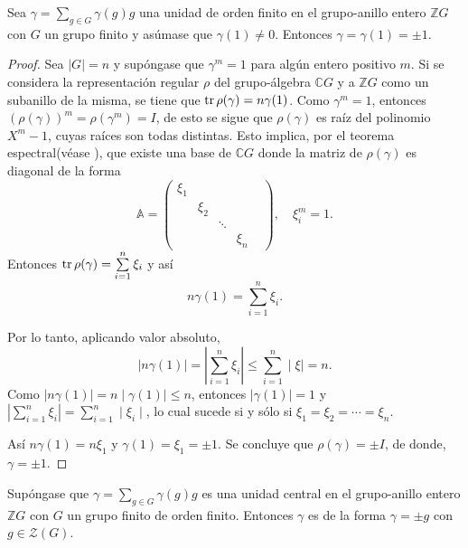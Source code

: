 \begin{lema}\label{lem:BH}
Sea $\gamma = \sum_{g \in G}\gamma(g)g$ una unidad de orden finito en el grupo-anillo entero  $\mathds{Z}G$ con $G$ un grupo finito y asúmase que $\gamma(1)\neq 0$. Entonces $\gamma = \gamma(1) = \pm 1.$
\end{lema}
\begin{proof}
Sea $|G| = n$ y supóngase que $\gamma^{m} = 1$ para algún entero positivo $m$. Si se considera la representación regular $\rho$ del grupo-álgebra $\mathds{C}G$ y a $\mathds{Z}G$ como un subanillo de la misma, se tiene que $\operatorname{tr}\rho(\gamma) = n\gamma(1)$.
Como $\gamma^{m} = 1$, entonces $\left( \rho(\gamma) \right)^m = \rho(\gamma^{m}) = I$, de esto se sigue que $\rho(\gamma)$ es raíz del polinomio $X^m-1$, cuyas raíces son todas distintas. Esto implica, por el teorema espectral(véase \cite[p 214]{bib:lang}), que existe una base de $\mathds{C}G$ donde la matriz de $\rho(\gamma)$ es diagonal de la forma
\begin{equation*}
\mathds{A} = \begin{pmatrix}
\xi_1 & & & &\\
 & \xi_2 & & \\
 & & \ddots & \\
  & & & \xi_n
\end{pmatrix}, \quad \xi_i^m = 1.
\end{equation*}
 Entonces $\operatorname{tr}\rho(\gamma) = \sum\limits_{i = 1}^{n}\xi_i$ y así
 \begin{equation*}
 n\gamma(1) = \sum\limits_{i =1}^{n}\xi_i.
 \end{equation*}
 
 Por lo tanto, aplicando valor absoluto,
 \begin{equation*}
 \mid n\gamma(1) \mid = \left| \sum_{i = 1}^{n}\xi_i \right| \leq \sum_{i = 1}^{n}\mid \xi \mid = n.
 \end{equation*}
 Como $\mid n\gamma(1)\mid = n\mid\gamma(1)\mid \leq n$, entonces $\mid \gamma(1) \mid = 1$ y $\left| \sum_{i = 1}^{n}\xi_i \right| = \sum\limits_{i = 1}^{n}\mid \xi_i \mid$, lo cual sucede si y sólo si $\xi_1=\xi_2=\cdots = \xi_n$.
 
 Así $n\gamma(1) = n\xi_1$ y $\gamma(1) = \xi_1=\pm 1$. Se concluye que $\rho(\gamma) = \pm I$, de donde, $\gamma = \pm 1$.
\end{proof}
\begin{corolario}
Supóngase que $\gamma = \sum_{g \in G}\gamma(g)g$ es una unidad central en el grupo-anillo entero $\mathds{Z}G$ con $G$ un grupo finito de orden finito. Entonces $\gamma$ es de la forma $\gamma = \pm g$ con $g \in  \mathcal{Z}(G)$.
\end{corolario}
